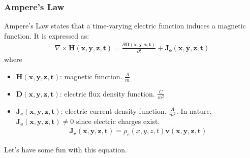 \subsubsection{Ampere's Law}

Ampere's Law states that a time-varying electric function induces a magnetic
function. It is expressed as:
\begin{align*}
  \nabla \times \mathbf{H(x,y,z,t)} = \frac{\partial \mathbf{D(x,y,z,t)}}{\partial t} + \mathbf{J_e(x,y,z,t)} \tag{3}
\end{align*}
where
\begin{itemize}
  \item \( \mathbf{H(x,y,z,t)} \): magnetic function. \( \frac{A}{m} \)
  \item \( \mathbf{D(x,y,z,t)} \): electric flux density function.
    \( \frac{C}{m^2} \)
  \item \( \mathbf{J_e(x,y,z,t)} \): electric current density function.
    \( \frac{A}{m^2} \). In nature, \( \mathbf{J_e(x,y,z,t)} \neq 0 \)
    since electric charges exist.
    \begin{align*}
      \mathbf{J_e(x,y,z,t)} = \rho_e(x,y,z,t) \mathbf{v(x,y,z,t)}
    \end{align*}
\end{itemize}
Let's have some fun with this equation.
